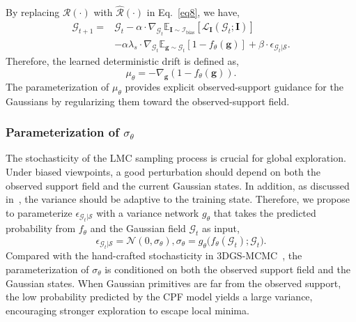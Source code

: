 \documentclass[lettersize,journal]{IEEEtran}
\begin{document}
By replacing $\mathcal{R}(\cdot)$ with $\widehat{\mathcal{R}}(\cdot)$ in Eq.~\ref{eq8}, we have, 
\begin{equation}
    \begin{aligned}
    \mathcal{G}_{t+1} = &\mathcal{G}_t - \alpha \cdot \nabla_{\mathcal{G}_t} \mathbb{E}_{\mathbf{I}\sim\mathcal{I}_{\text{bias}}}\!\left[\mathcal{L}_{\mathbf{I}}(\mathcal{G}_t;\mathbf{I})\right] \\
    &- \alpha \lambda_s \cdot \nabla_{\mathcal{G}_t} \mathbb{E}_{\mathbf{g} \sim \mathcal{G}_t} \left[ 1 - f_{\theta}( \mathbf{g} ) \right] + \beta \cdot \epsilon_{\mathcal{G}_t \vert \mathcal{S}}.
    \end{aligned}
    \label{eq13}
\end{equation}
Therefore, the learned deterministic drift is defined as, 
\begin{equation}
    \mu_{\theta} = -  \nabla_{\mathbf{g}}  (1 - f_{\theta}(\mathbf{g})).
    \label{eq13.1}
\end{equation}
The parameterization of $\mu_{\theta}$ provides explicit observed-support guidance for the Gaussians by regularizing them toward the observed-support field.

\subsubsection{Parameterization of \texorpdfstring{$\sigma_{\theta}$}{sigma-theta}}

The stochasticity of the LMC sampling process is crucial for global exploration. 
Under biased viewpoints, a good perturbation should depend on both the observed support field and the current Gaussian states. 
In addition, as discussed in~\cite{sgld2}, the variance should be adaptive to the training state. Therefore, we propose to parameterize $\epsilon_{\mathcal{G}_t \vert \mathcal{S}}$ with a variance network $g_{\theta}$ that takes the predicted probability from $f_{\theta}$ and the Gaussian field $\mathcal{G}_t$ as input,
\begin{equation}
    \epsilon_{\mathcal{G}_t \vert \mathcal{S}} = \mathcal{N} (0, \sigma_{\theta}), \sigma_{\theta} = g_{\theta}\big(f_{\theta}(\mathcal{G}_t); \mathcal{G}_t\big).
    \label{eq15}
\end{equation}
Compared with the hand-crafted stochasticity in 3DGS-MCMC~\cite{mcmc}, the parameterization of $\sigma_{\theta}$ is conditioned on both the observed support field and the Gaussian states. When Gaussian primitives are far from the observed support, the low probability predicted by the CPF model yields a large variance, encouraging stronger exploration to escape local minima.
\end{document}
